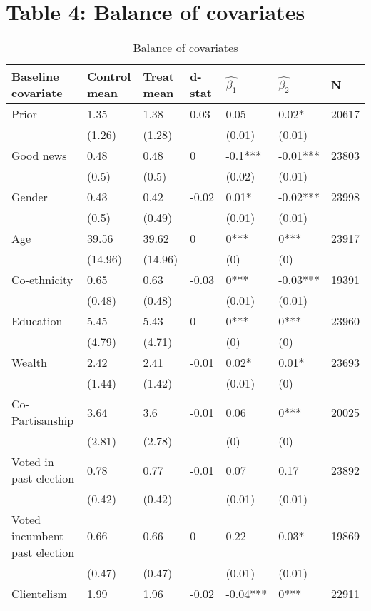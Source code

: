 \documentclass[]{article}
\begin{document}
\clearpage

\section{Table 4: Balance of
covariates}\label{table-4-balance-of-covariates}

\begin{table}[h!]
\caption{Balance of covariates}
\centering
\footnotesize
\begin{tabular}{lllllll}
  \hline
Baseline covariate & Control mean  & Treat mean & d-stat & $\hat{\beta_1}$ & $\hat{\beta_2}$ & N \\ 
  \hline
Prior & 1.35 & 1.38 & 0.03 & 0.05 & 0.02* & 20617 \\ 
   & (1.26) & (1.28) &  & (0.01) & (0.01) &  \\ 
  Good news & 0.48 & 0.48 & 0 & -0.1*** & -0.01*** & 23803 \\ 
   & (0.5) & (0.5) &  & (0.02) & (0.01) &  \\ 
  Gender & 0.43 & 0.42 & -0.02 & 0.01* & -0.02*** & 23998 \\ 
   & (0.5) & (0.49) &  & (0.01) & (0.01) &  \\ 
  Age & 39.56 & 39.62 & 0 & 0*** & 0*** & 23917 \\ 
   & (14.96) & (14.96) &  & (0) & (0) &  \\ 
  Co-ethnicity & 0.65 & 0.63 & -0.03 & 0*** & -0.03*** & 19391 \\ 
   & (0.48) & (0.48) &  & (0.01) & (0.01) &  \\ 
  Education & 5.45 & 5.43 & 0 & 0*** & 0*** & 23960 \\ 
   & (4.79) & (4.71) &  & (0) & (0) &  \\ 
  Wealth & 2.42 & 2.41 & -0.01 & 0.02* & 0.01* & 23693 \\ 
   & (1.44) & (1.42) &  & (0.01) & (0) &  \\ 
  Co-Partisanship & 3.64 & 3.6 & -0.01 & 0.06 & 0*** & 20025 \\ 
   & (2.81) & (2.78) &  & (0) & (0) &  \\ 
  Voted in past election & 0.78 & 0.77 & -0.01 & 0.07 & 0.17 & 23892 \\ 
   & (0.42) & (0.42) &  & (0.01) & (0.01) &  \\ 
  Voted incumbent past election & 0.66 & 0.66 & 0 & 0.22 & 0.03* & 19869 \\ 
   & (0.47) & (0.47) &  & (0.01) & (0.01) &  \\ 
  Clientelism & 1.99 & 1.96 & -0.02 & -0.04*** & 0*** & 22911 \\ 

\end{tabular}
\end{table}
\end{document}
